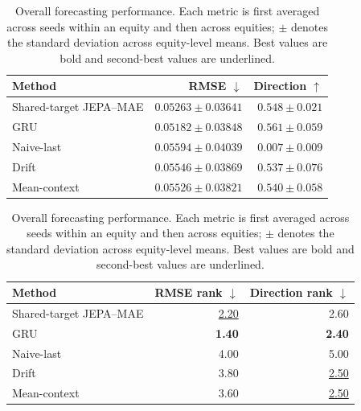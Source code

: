 \begin{table}[t]
\centering
\small
\caption{Overall forecasting performance. Each metric is first averaged across seeds within an equity and then across equities; $\pm$ denotes the standard deviation across equity-level means. Best values are bold and second-best values are underlined.}
\label{tab:main_metrics}
\begin{tabular}{lrr}
\toprule
Method & RMSE $\downarrow$ & Direction $\uparrow$ \\
\midrule
Shared-target JEPA--MAE & \underline{$0.05263 \pm 0.03641$} & \underline{$0.548 \pm 0.021$} \\
GRU & \textbf{$0.05182 \pm 0.03848$} & \textbf{$0.561 \pm 0.059$} \\
Naive-last & $0.05594 \pm 0.04039$ & $0.007 \pm 0.009$ \\
Drift & $0.05546 \pm 0.03869$ & $0.537 \pm 0.076$ \\
Mean-context & $0.05526 \pm 0.03821$ & $0.540 \pm 0.058$ \\
\bottomrule
\end{tabular}
\par\medskip
\begin{tabular}{lrr}
\toprule
Method & RMSE rank $\downarrow$ & Direction rank $\downarrow$ \\
\midrule
Shared-target JEPA--MAE & \underline{2.20} & 2.60 \\
GRU & \textbf{1.40} & \textbf{2.40} \\
Naive-last & 4.00 & 5.00 \\
Drift & 3.80 & \underline{2.50} \\
Mean-context & 3.60 & \underline{2.50} \\
\bottomrule
\end{tabular}
\end{table}

